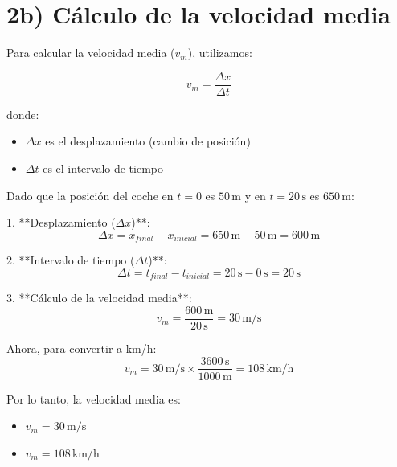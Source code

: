\documentclass{article}
\begin{document}
\section*{2b) Cálculo de la velocidad media}

Para calcular la velocidad media (\(v_m\)), utilizamos:

\[
v_m = \frac{\Delta x}{\Delta t}
\]

donde:

\begin{itemize}
    \item \(\Delta x\) es el desplazamiento (cambio de posición) 
    \item \(\Delta t\) es el intervalo de tiempo
\end{itemize}

Dado que la posición del coche en \(t = 0\) es \(50 \, \text{m}\) y en \(t = 20 \, \text{s}\) es \(650 \, \text{m}\):

1. **Desplazamiento (\(\Delta x\))**:
   \[
   \Delta x = x_{final} - x_{inicial} = 650 \, \text{m} - 50 \, \text{m} = 600 \, \text{m}
   \]

2. **Intervalo de tiempo (\(\Delta t\))**:
   \[
   \Delta t = t_{final} - t_{inicial} = 20 \, \text{s} - 0 \, \text{s} = 20 \, \text{s}
   \]

3. **Cálculo de la velocidad media**:
   \[
   v_m = \frac{600 \, \text{m}}{20 \, \text{s}} = 30 \, \text{m/s}
   \]

Ahora, para convertir a km/h:
\[
v_m = 30 \, \text{m/s} \times \frac{3600 \, \text{s}}{1000 \, \text{m}} = 108 \, \text{km/h}
\]

Por lo tanto, la velocidad media es:

\begin{itemize}
    \item \(v_m = 30 \, \text{m/s}\)
    \item \(v_m = 108 \, \text{km/h}\)
\end{itemize}
\end{document}
